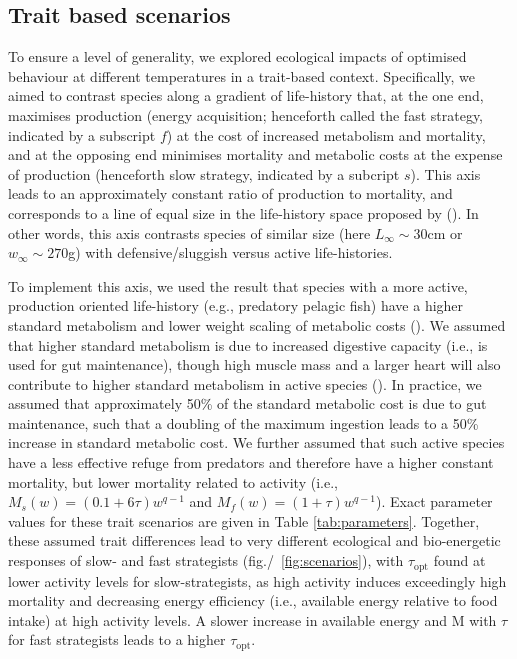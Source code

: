 \documentclass[11pt]{article}\usepackage[]{graphicx}\usepackage[]{color}
\begin{document}
\subsection*{Trait based scenarios}

To ensure a level of generality, we explored ecological impacts of optimised behaviour at different temperatures in a trait-based context. Specifically, we aimed to contrast species along a gradient of life-history that, at the one end, maximises production (energy acquisition; henceforth called the fast strategy, indicated by a subscript $f$) at the cost of increased metabolism and mortality, and at the opposing end minimises mortality and metabolic costs at the expense of production (henceforth slow strategy, indicated by a subcript $s$). This axis leads to an approximately constant ratio of production to mortality, and corresponds to a line of equal size in the life-history space proposed by \citeauthor{charnov_evolutionary_2013} (\citeyear{charnov_evolutionary_2013}). In other words, this axis contrasts species of similar size (here $L_{\infty}\sim 30$cm or $w_{\infty}\sim 270$g) with defensive/sluggish versus active life-histories.

To implement this axis, we used the result that species with a more
active, production oriented life-history (e.g., predatory pelagic
fish) have a higher standard metabolism and lower weight scaling of
metabolic costs
(\cite{priede_metabolic_1985,killen_intraspecific_2010}). We assumed
that higher standard metabolism is due to increased digestive capacity
(i.e., is used for gut maintenance), though high muscle mass and a
larger heart will also contribute to higher standard metabolism in
active species (\cite{priede_metabolic_1985}). In practice, we assumed
that approximately 50\% of the standard metabolic cost is due to gut
maintenance, such that a doubling of the maximum ingestion leads to a
50\% increase in standard metabolic cost. We further assumed that such active species have a less effective refuge from predators and therefore have a higher constant mortality, but lower mortality related to activity (i.e., $M_{s}(w) = (0.1+6\tau) w^{q-1}$ and $M_{f}(w) = (1+\tau) w^{q-1}$). Exact parameter values for these trait scenarios are given in Table \ref{tab:parameters}. Together, these assumed trait differences lead to very different ecological and bio-energetic responses of slow- and fast strategists (fig./~\ref{fig:scenarios}), with $\tau_{\text{opt}}$ found at lower activity levels for slow-strategists, as high activity induces exceedingly high mortality and decreasing energy efficiency (i.e., available energy relative to food intake) at high activity levels. A slower increase in available energy and M with $\tau$ for fast strategists leads to a higher $\tau_{\text{opt}}$.
\end{document}
